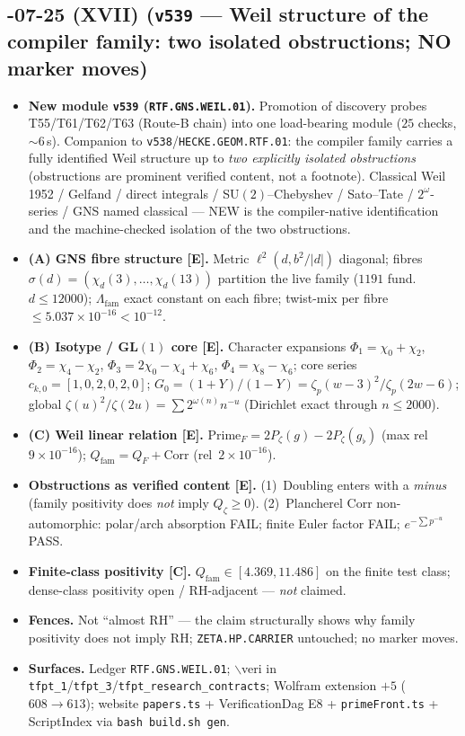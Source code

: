 \documentclass[11pt]{article}
\providecommand{\mE}{\textbf{[E]}}\providecommand{\mC}{\textbf{[C]}}
\begin{document}
\subsection*{-07-25 (XVII) (\texttt{v539} --- Weil structure of the compiler family: two isolated obstructions; NO marker moves)}
\begin{itemize}[leftmargin=1.5em]
\item \textbf{New module \texttt{v539} (\texttt{RTF.GNS.WEIL.01}).} Promotion of discovery probes
T55/T61/T62/T63 (Route-B chain) into one load-bearing module ($25$ checks, $\sim6$\,s).
Companion to \texttt{v538}/\texttt{HECKE.GEOM.RTF.01}: the compiler family carries a fully
identified Weil structure up to \emph{two explicitly isolated obstructions}
(obstructions are prominent verified content, not a footnote). Classical Weil 1952 / Gelfand /
direct integrals / SU$(2)$--Chebyshev / Sato--Tate / $2^\omega$-series / GNS named classical ---
NEW is the compiler-native identification and the machine-checked isolation of the two
obstructions.
\item \textbf{(A) GNS fibre structure \mE.} Metric $\ell^2(d,b^2/|d|)$ diagonal; fibres
$\sigma(d)=(\chi_d(3),\ldots,\chi_d(13))$ partition the live family ($1191$ fund.\ $d\le12000$);
$\Lambda_{\mathrm{fam}}$ exact constant on each fibre; twist-mix per fibre
$\le5.037\times10^{-16}<10^{-12}$.
\item \textbf{(B) Isotype / GL$(1)$ core \mE.} Character expansions
$\Phi_1=\chi_0+\chi_2$, $\Phi_2=\chi_4-\chi_2$, $\Phi_3=2\chi_0-\chi_4+\chi_6$,
$\Phi_4=\chi_8-\chi_6$; core series $c_{k,0}=[1,0,2,0,2,0]$;
$G_0=(1+Y)/(1-Y)=\zeta_p(w-3)^2/\zeta_p(2w-6)$; global
$\zeta(u)^2/\zeta(2u)=\sum 2^{\omega(n)}n^{-u}$ (Dirichlet exact through $n\le2000$).
\item \textbf{(C) Weil linear relation \mE.}
$\mathrm{Prime}_F=2P_\zeta(g)-2P_\zeta(g_\flat)$ (max rel~$9\times10^{-16}$);
$Q_{\mathrm{fam}}=Q_F+\mathrm{Corr}$ (rel~$2\times10^{-16}$).
\item \textbf{Obstructions as verified content \mE.}
(1)~Doubling enters with a \emph{minus} (family positivity does \emph{not} imply $Q_\zeta\ge0$).
(2)~Plancherel Corr non-automorphic: polar/arch absorption FAIL; finite Euler factor FAIL;
$e^{-\sum p^{-u}}$ PASS.
\item \textbf{Finite-class positivity \mC.} $Q_{\mathrm{fam}}\in[4.369,11.486]$ on the finite
test class; dense-class positivity open / RH-adjacent --- \emph{not} claimed.
\item \textbf{Fences.} Not ``almost RH'' --- the claim structurally shows why family positivity
does not imply RH; \texttt{ZETA.HP.CARRIER} untouched; no marker moves.
\item \textbf{Surfaces.} Ledger \texttt{RTF.GNS.WEIL.01}; $\backslash$veri in
\texttt{tfpt\_1}/\texttt{tfpt\_3}/\texttt{tfpt\_research\_contracts}; Wolfram extension $+5$
($608\to613$); website \texttt{papers.ts} + VerificationDag E8 + \texttt{primeFront.ts} +
ScriptIndex via \texttt{bash build.sh gen}.
\end{itemize}
\end{document}
